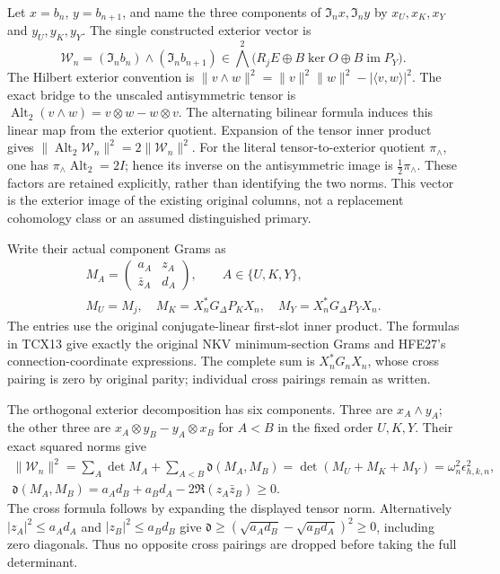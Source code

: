 \documentclass[11pt,a4paper]{article}
\begin{document}
Let $x=b_n$, $y=b_{n+1}$, and name the three components of
$\mathfrak I_n x,\mathfrak I_n y$ by $x_U,x_K,x_Y$ and $y_U,y_K,y_Y$.
The single constructed exterior vector is
\begin{equation}\tag{TCX14}
 \mathcal W_n=(\mathfrak I_n b_n)\wedge(\mathfrak I_n b_{n+1})
       \in\bigwedge^2\bigl(R_jE\oplus B\ker O\oplus B\operatorname{im}P_Y\bigr).
\end{equation}
The Hilbert exterior convention is
$\|v\wedge w\|^2=\|v\|^2\|w\|^2-|\langle v,w\rangle|^2$.
The exact bridge to the unscaled antisymmetric tensor is
$\operatorname{Alt}_2(v\wedge w)=v\otimes w-w\otimes v$.
The alternating bilinear formula induces this linear map from the
exterior quotient. Expansion of the tensor inner product gives
$\|\operatorname{Alt}_2\mathcal W_n\|^2=2\|\mathcal W_n\|^2$.
For the literal tensor-to-exterior quotient $\pi_\wedge$, one has
$\pi_\wedge\operatorname{Alt}_2=2I$; hence its inverse on the
antisymmetric image is $\tfrac12\pi_\wedge$. These factors are
retained explicitly, rather than identifying the two norms.
This vector is the exterior image of the existing original columns,
not a replacement cohomology class or an assumed distinguished primary.

Write their actual component Grams as
\[
 \begin{gathered}
 M_A=\begin{pmatrix}a_A&z_A\\\bar z_A&d_A\end{pmatrix},
 \qquad A\in\{U,K,Y\},\\
 M_U=M_j,\quad M_K=X_n^*G_\Delta P_KX_n,\quad
 M_Y=X_n^*G_\Delta P_YX_n.
 \end{gathered}
\]
The entries use the original conjugate-linear first-slot inner product.
The formulas in TCX13 give exactly the original NKV minimum-section
Grams and HFE27's connection-coordinate expressions. The complete sum
is $X_n^*G_nX_n$, whose cross pairing is zero by original parity;
individual cross pairings remain as written.

The orthogonal exterior decomposition has six components. Three are
$x_A\wedge y_A$; the other three are
$x_A\otimes y_B-y_A\otimes x_B$ for $A<B$ in the fixed order $U,K,Y$.
Their exact squared norms give
\begin{equation}\tag{TCX15}
\begin{gathered}
 \|\mathcal W_n\|^2
 =\sum_A\det M_A+\sum_{A<B}\mathfrak d(M_A,M_B)
 =\det(M_U+M_K+M_Y)=\omega_n^2\epsilon_{h,k,n}^2,\\
 \mathfrak d(M_A,M_B)=a_Ad_B+a_Bd_A-2\Re(z_A\bar z_B)\ge0.
\end{gathered}
\end{equation}
The cross formula follows by expanding the displayed tensor norm.
Alternatively $|z_A|^2\le a_Ad_A$ and $|z_B|^2\le a_Bd_B$ give
$\mathfrak d\ge(\sqrt{a_Ad_B}-\sqrt{a_Bd_A})^2\ge0$,
including zero diagonals. Thus no opposite cross pairings are dropped
before taking the full determinant.
\end{document}
